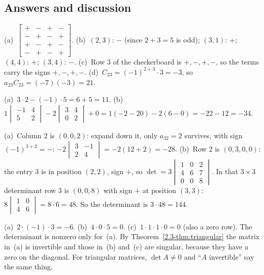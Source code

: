 \documentclass[11pt]{article}
\begin{document}
\subsection*{Answers and discussion}
\begin{description}[leftmargin=0pt,itemsep=5pt]
  \item[Knowledge Check \ref{kc:signs}.] (a)~$\begin{bmatrix}+&-&+&-\\-&+&-&+\\+&-&+&-\\-&+&-&+\end{bmatrix}$. (b)~$(2,3)$: $-$ (since $2+3=5$ is odd); $(3,1)$: $+$; $(4,4)$: $+$; $(3,4)$: $-$. (c)~Row $3$ of the checkerboard is $+,-,+,-$, so the terms carry the signs $+,-,+,-$. (d)~$C_{23}=(-1)^{2+3}\cdot3=-3$, so $a_{23}C_{23}=(-7)(-3)=21$.
  \item[Knowledge Check \ref{kc:compute}.] (a)~$3\cdot2-(-1)\cdot5=6+5=11$. (b)~$1\begin{vmatrix}-1&4\\5&2\end{vmatrix}-2\begin{vmatrix}3&4\\0&2\end{vmatrix}+0=1(-2-20)-2(6-0)=-22-12=-34$.
  \item[Knowledge Check \ref{kc:choose}.] (a)~Column $2$ is $(0,0,2)$: expand down it, only $a_{32}=2$ survives, with sign $(-1)^{3+2}=-$: $-2\begin{vmatrix}3&-1\\2&4\end{vmatrix}=-2(12+2)=-28$. (b)~Row $2$ is $(0,3,0,0)$: the entry $3$ is in position $(2,2)$, sign $+$, so $\det=3\begin{vmatrix}1&0&2\\4&6&7\\0&0&8\end{vmatrix}$. In that $3\times3$ determinant row $3$ is $(0,0,8)$ with sign $+$ at position $(3,3)$: $8\begin{vmatrix}1&0\\4&6\end{vmatrix}=8\cdot6=48$. So the determinant is $3\cdot48=144$.
  \item[Knowledge Check \ref{kc:tri}.] (a)~$2\cdot(-1)\cdot3=-6$. (b)~$4\cdot0\cdot5=0$. (c)~$1\cdot1\cdot1\cdot0=0$ (also a zero row). The determinant is nonzero only for~(a). By Theorem~\ref{2.3-thm:triangular} the matrix in~(a) is invertible and those in~(b) and~(c) are singular, because they have a zero on the diagonal. For triangular matrices, $\det A\neq0$ and ``$A$ invertible'' say the same thing.

\end{description}
\end{document}

